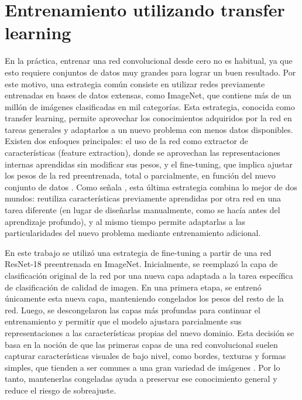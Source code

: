 \section{Entrenamiento utilizando transfer learning}
En la práctica, entrenar una red convolucional desde cero no es habitual, ya que esto requiere conjuntos de datos muy grandes para lograr un buen resultado. Por este motivo, una estrategia común consiste en utilizar redes previamente entrenadas en bases de datos extensas, como ImageNet, que contiene más de un millón de imágenes clasificadas en mil categorías. Esta estrategia, conocida como transfer learning, permite aprovechar los conocimientos adquiridos por la red en tareas generales y adaptarlos a un nuevo problema con menos datos disponibles. Existen dos enfoques principales: el uso de la red como extractor de características (feature extraction), donde se aprovechan las representaciones internas aprendidas sin modificar sus pesos, y el fine-tuning, que implica ajustar los pesos de la red preentrenada, total o parcialmente, en función del nuevo conjunto de datos \parencites{cs231n2023transfer}. Como señala \cite{stevens2020deep}, esta última estrategia combina lo mejor de dos mundos: reutiliza características previamente aprendidas por otra red en una tarea diferente (en lugar de diseñarlas manualmente, como se hacía antes del aprendizaje profundo), y al mismo tiempo permite adaptarlas a las particularidades del nuevo problema mediante entrenamiento adicional.

En este trabajo se utilizó una estrategia de fine-tuning a partir de una red ResNet-18 preentrenada en ImageNet. Inicialmente, se reemplazó la capa de clasificación original de la red por una nueva capa adaptada a la tarea específica de clasificación de calidad de imagen. En una primera etapa, se entrenó únicamente esta nueva capa, manteniendo congelados los pesos del resto de la red. Luego, se descongelaron las capas más profundas para continuar el entrenamiento y permitir que el modelo ajustara parcialmente sus representaciones a las características propias del nuevo dominio. Esta decisión se basa en la noción de que las primeras capas de una red convolucional suelen capturar características visuales de bajo nivel, como bordes, texturas y formas simples, que tienden a ser comunes a una gran variedad de imágenes \parencites{stevens2020deep}. Por lo tanto, mantenerlas congeladas ayuda a preservar ese conocimiento general y reduce el riesgo de sobreajuste.

